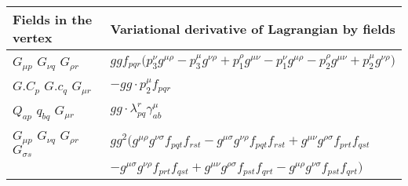\textwidth 17cm
\textheight 25cm
\hoffset -3cm
\voffset -1cm
\pagestyle{empty}

\begin{center}

\begin{tabular}{|l|l|} \hline
Fields in the vertex & Variational derivative of Lagrangian by fields \\ \hline
${G}_{\mu p }$ \phantom{-} ${G}_{\nu q }$ \phantom{-} ${G}_{\rho r }$ \phantom{-}  &
	$ ggf_{p q r} \big(p_3^\nu g^{\mu \rho} -p_3^\mu g^{\nu \rho} +p_1^\rho g^{\mu \nu} -p_1^\nu g^{\mu \rho} -p_2^\rho g^{\mu \nu} +p_2^\mu g^{\nu \rho} \big)$\\[2mm]
${G.C}_{p }$ \phantom{-} ${G.c}_{q }$ \phantom{-} ${G}_{\mu r }$ \phantom{-}  &
	$- gg\cdot p_2^\mu f_{p q r} $\\[2mm]
${Q}_{a p }$ \phantom{-} ${q}_{b q }$ \phantom{-} ${G}_{\mu r }$ \phantom{-}  &
	$ gg\cdot \lambda_{p q}^r \gamma_{a b}^\mu $\\[2mm]
${G}_{\mu p }$ \phantom{-} ${G}_{\nu q }$ \phantom{-} ${G}_{\rho r }$ \phantom{-} ${G}_{\sigma s }$ \phantom{-}  &
	$ gg{}^2 \big(g^{\mu \rho} g^{\nu \sigma} f_{p q t} f_{r s t} -g^{\mu \sigma} g^{\nu \rho} f_{p q t} f_{r s t} +g^{\mu \nu} g^{\rho \sigma} f_{p r t} f_{q s t} $ \\[2mm]
  & $-g^{\mu \sigma} g^{\nu \rho} f_{p r t} f_{q s t} +g^{\mu \nu} g^{\rho \sigma} f_{p s t} f_{q r t} -g^{\mu \rho} g^{\nu \sigma} f_{p s t} f_{q r t} \big)$\\ \hline
\end{tabular}

\end{center}


